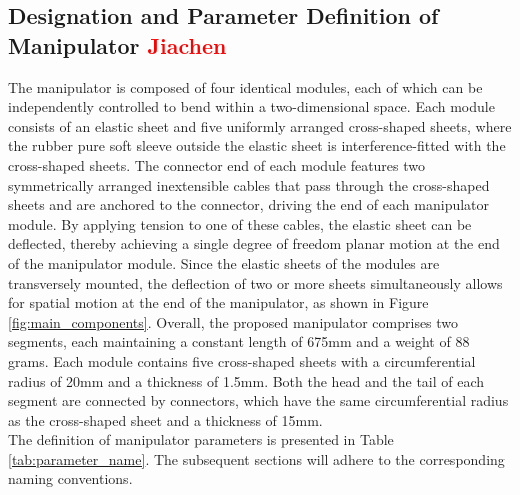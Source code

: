 \subsection{Designation and Parameter Definition of Manipulator \textcolor{red}{Jiachen}}
The manipulator is composed of four identical modules, each of which can be independently controlled to bend within a 
two-dimensional space. Each module consists of an elastic sheet and five uniformly arranged cross-shaped sheets, where 
the rubber pure soft sleeve outside the elastic sheet is interference-fitted with the cross-shaped sheets. The connector 
end of each module features two symmetrically arranged inextensible cables that pass through the cross-shaped sheets and 
are anchored to the connector, driving the end of each manipulator module. By applying tension to one of these cables, 
the elastic sheet can be deflected, thereby achieving a single degree of freedom planar motion at the end of the 
manipulator module. Since the elastic sheets of the modules are transversely mounted, the deflection of two or more 
sheets simultaneously allows for spatial motion at the end of the manipulator, as shown in Figure \ref{fig:main_components}. 
Overall, the proposed manipulator comprises two segments, each maintaining a constant length of 675mm and a weight of 
88 grams. Each module contains five cross-shaped sheets with a circumferential radius of 20mm and a thickness of 1.5mm. 
Both the head and the tail of each segment are connected by connectors, which have the same circumferential radius as 
the cross-shaped sheet and a thickness of 15mm. \\
The definition of manipulator parameters is presented in Table \ref{tab:parameter_name}. The subsequent sections 
will adhere to the corresponding naming conventions.

